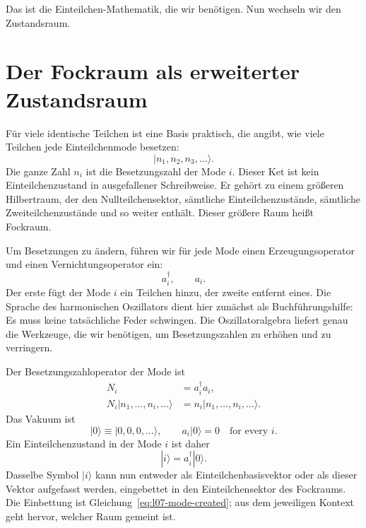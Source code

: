 \begin{classroomqa}
\end{classroomqa}

Das ist die Einteilchen-Mathematik, die wir benötigen. Nun wechseln wir den Zustandsraum.

\section{Der Fockraum als erweiterter Zustandsraum}

Für viele identische Teilchen ist eine Basis praktisch, die angibt, wie viele Teilchen jede Einteilchenmode besetzen:
\begin{equation}
|n_1,n_2,n_3,\ldots\rangle.
\label{eq:l07-fock-basis}
\end{equation}
Die ganze Zahl \(n_i\) ist die Besetzungszahl der Mode \(i\). Dieser Ket ist kein Einteilchenzustand in ausgefallener Schreibweise. Er gehört zu einem größeren Hilbertraum, der den Nullteilchensektor, sämtliche Einteilchenzustände, sämtliche Zweiteilchenzustände und so weiter enthält. Dieser größere Raum heißt Fockraum.

Um Besetzungen zu ändern, führen wir für jede Mode einen Erzeugungsoperator und einen Vernichtungsoperator ein:
\begin{equation}
a_i^\dagger,\qquad a_i.
\end{equation}
Der erste fügt der Mode \(i\) ein Teilchen hinzu, der zweite entfernt eines. Die Sprache des harmonischen Oszillators dient hier zunächst als Buchführungshilfe: Es muss keine tatsächliche Feder schwingen. Die Oszillatoralgebra liefert genau die Werkzeuge, die wir benötigen, um Besetzungszahlen zu erhöhen und zu verringern.

Der Besetzungszahloperator der Mode ist
\begin{equation}
\begin{aligned}
N_i&=a_i^\dagger a_i,\\
N_i|n_1,\ldots,n_i,\ldots\rangle
&=n_i|n_1,\ldots,n_i,\ldots\rangle.
\end{aligned}
\end{equation}
Das Vakuum ist
\begin{equation}
|0\rangle\equiv|0,0,0,\ldots\rangle,
\qquad
a_i|0\rangle=0
\quad\text{for every }i.
\label{eq:l07-vacuum}
\end{equation}
Ein Einteilchenzustand in der Mode \(i\) ist daher
\begin{equation}
|i\rangle=a_i^\dagger|0\rangle.
\label{eq:l07-mode-created}
\end{equation}
Dasselbe Symbol \(|i\rangle\) kann nun entweder als Einteilchenbasisvektor oder als dieser Vektor aufgefasst werden, eingebettet in den Einteilchensektor des Fockraums. Die Einbettung ist Gleichung~\eqref{eq:l07-mode-created}; aus dem jeweiligen Kontext geht hervor, welcher Raum gemeint ist.

